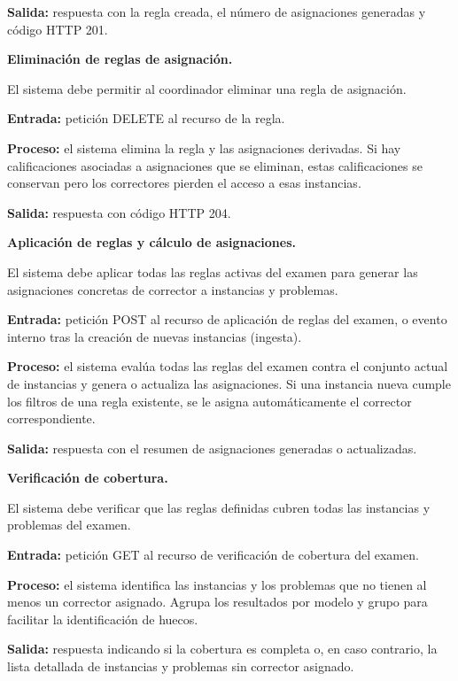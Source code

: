 \begin{functional}
\begin{functional}
    \textbf{Salida:} respuesta con la regla creada, el número de asignaciones generadas y código HTTP 201.

    \item \textbf{Eliminación de reglas de asignación.}

    El sistema debe permitir al coordinador eliminar una regla de asignación.

    \textbf{Entrada:} petición DELETE al recurso de la regla.

    \textbf{Proceso:} el sistema elimina la regla y las asignaciones derivadas. Si hay calificaciones asociadas a asignaciones que se eliminan, estas calificaciones se conservan pero los correctores pierden el acceso a esas instancias.

    \textbf{Salida:} respuesta con código HTTP 204.

    \item \textbf{Aplicación de reglas y cálculo de asignaciones.}

    El sistema debe aplicar todas las reglas activas del examen para generar las asignaciones concretas de corrector a instancias y problemas.

    \textbf{Entrada:} petición POST al recurso de aplicación de reglas del examen, o evento interno tras la creación de nuevas instancias (ingesta).

    \textbf{Proceso:} el sistema evalúa todas las reglas del examen contra el conjunto actual de instancias y genera o actualiza las asignaciones. Si una instancia nueva cumple los filtros de una regla existente, se le asigna automáticamente el corrector correspondiente.

    \textbf{Salida:} respuesta con el resumen de asignaciones generadas o actualizadas.

    \item \textbf{Verificación de cobertura.}

    El sistema debe verificar que las reglas definidas cubren todas las instancias y problemas del examen.

    \textbf{Entrada:} petición GET al recurso de verificación de cobertura del examen.

    \textbf{Proceso:} el sistema identifica las instancias y los problemas que no tienen al menos un corrector asignado. Agrupa los resultados por modelo y grupo para facilitar la identificación de huecos.

    \textbf{Salida:} respuesta indicando si la cobertura es completa o, en caso contrario, la lista detallada de instancias y problemas sin corrector asignado.


\end{functional}
\end{functional}
